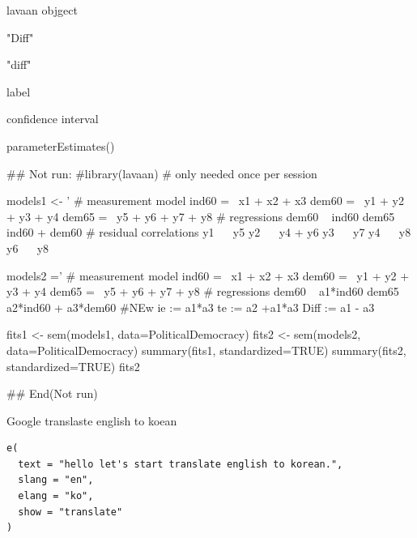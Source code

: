 \documentclass[a4paper]{book}
\begin{document}
%
\begin{Arguments}
\begin{ldescription}
\item[\code{model\_sem}] lavaan objgect

\item[\code{effect1}] "Diff"

\item[\code{effect2}] "diff"

\item[\code{label}] label

\item[\code{ci}] confidence interval
\end{ldescription}
\end{Arguments}
%
\begin{Value}
parameterEstimates()
\end{Value}
%
\begin{Examples}
\begin{ExampleCode}

\#\# Not run: 
#library(lavaan) # only needed once per session

models1 <- '
  # measurement model
    ind60 =~ x1 + x2 + x3
    dem60 =~ y1 + y2 + y3 + y4
    dem65 =~ y5 + y6 + y7 + y8
    # regressions
    dem60 ~ ind60
    dem65 ~ ind60 + dem60
      # residual correlations
    y1 ~~ y5
    y2 ~~ y4 + y6
    y3 ~~ y7
    y4 ~~ y8
    y6 ~~ y8

models2 ='
  # measurement model
    ind60 =~ x1 + x2 + x3
    dem60 =~ y1 + y2 + y3 + y4
    dem65 =~ y5 + y6 + y7 + y8
     # regressions
    dem60 ~ a1*ind60
    dem65 ~ a2*ind60 + a3*dem60
 #NEw
   ie := a1*a3
   te := a2 +a1*a3
   Diff := a1 - a3




fits1 <- sem(models1, data=PoliticalDemocracy)
fits2 <- sem(models2, data=PoliticalDemocracy)
summary(fits1, standardized=TRUE)
summary(fits2, standardized=TRUE)
fits2 %

## End(Not run)
\end{ExampleCode}
\end{Examples}
%
\begin{Description}
Google translaste english  to koean
\end{Description}
%
\begin{Usage}
\begin{verbatim}
e(
  text = "hello let's start translate english to korean.",
  slang = "en",
  elang = "ko",
  show = "translate"
)
\end{verbatim}
\end{Usage}
\end{document}
